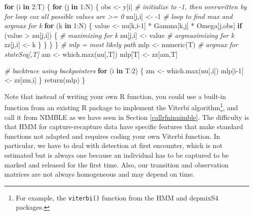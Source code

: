\documentclass[
  12pt,
]{krantz}
\newenvironment{Shaded}{\begin{snugshade}}{\end{snugshade}}
\newcommand{\CommentTok}[1]{\textcolor[rgb]{0.56,0.35,0.01}{\textit{#1}}}
\newcommand{\ControlFlowTok}[1]{\textcolor[rgb]{0.13,0.29,0.53}{\textbf{#1}}}
\newcommand{\DecValTok}[1]{\textcolor[rgb]{0.00,0.00,0.81}{#1}}
\newcommand{\FunctionTok}[1]{\textcolor[rgb]{0.00,0.00,0.00}{#1}}
\newcommand{\NormalTok}[1]{#1}
\newcommand{\OtherTok}[1]{\textcolor[rgb]{0.56,0.35,0.01}{#1}}
\newcommand{\SpecialCharTok}[1]{\textcolor[rgb]{0.00,0.00,0.00}{#1}}
\begin{document}
\begin{Shaded}
\begin{Highlighting}[]
\ControlFlowTok{for}\NormalTok{ (i }\ControlFlowTok{in} \DecValTok{2}\SpecialCharTok{:}\NormalTok{T) \{}
    \ControlFlowTok{for}\NormalTok{ (j }\ControlFlowTok{in} \DecValTok{1}\SpecialCharTok{:}\NormalTok{N) \{}
\NormalTok{      obs }\OtherTok{\textless{}{-}}\NormalTok{ y[i]}
      \CommentTok{\# initialize to {-}1, then overwritten by for loop coz all possible values are \textgreater{}= 0}
\NormalTok{      nu[j,i] }\OtherTok{\textless{}{-}} \SpecialCharTok{{-}}\DecValTok{1}
      \CommentTok{\# loop to find max and argmax for k}
      \ControlFlowTok{for}\NormalTok{ (k }\ControlFlowTok{in} \DecValTok{1}\SpecialCharTok{:}\NormalTok{N) \{}
\NormalTok{        value }\OtherTok{\textless{}{-}}\NormalTok{ nu[k,i}\DecValTok{{-}1}\NormalTok{] }\SpecialCharTok{*}\NormalTok{ Gamma[k,j] }\SpecialCharTok{*}\NormalTok{ Omega[j,obs]}
        \ControlFlowTok{if}\NormalTok{ (value }\SpecialCharTok{\textgreater{}}\NormalTok{ nu[j,i]) \{}
          \CommentTok{\# maximizing for k}
\NormalTok{          nu[j,i] }\OtherTok{\textless{}{-}}\NormalTok{ value}
          \CommentTok{\# argmaximizing for k}
\NormalTok{          zz[j,i] }\OtherTok{\textless{}{-}}\NormalTok{ k}
\NormalTok{        \}}
\NormalTok{      \}}
\NormalTok{    \}}
\NormalTok{  \}}
  \CommentTok{\# mlp = most likely path}
\NormalTok{  mlp }\OtherTok{\textless{}{-}} \FunctionTok{numeric}\NormalTok{(T)}
  \CommentTok{\# argmax for stateSeq[,T]}
\NormalTok{  am }\OtherTok{\textless{}{-}} \FunctionTok{which.max}\NormalTok{(nu[,T])}
\NormalTok{  mlp[T] }\OtherTok{\textless{}{-}}\NormalTok{ zz[am,T]}
  
  \CommentTok{\# backtrace using backpointers}
  \ControlFlowTok{for}\NormalTok{ (i }\ControlFlowTok{in}\NormalTok{ T}\SpecialCharTok{:}\DecValTok{2}\NormalTok{) \{}
\NormalTok{    zm }\OtherTok{\textless{}{-}} \FunctionTok{which.max}\NormalTok{(nu[,i])}
\NormalTok{    mlp[i}\DecValTok{{-}1}\NormalTok{] }\OtherTok{\textless{}{-}}\NormalTok{ zz[zm,i]}
\NormalTok{  \}}
  \FunctionTok{return}\NormalTok{(mlp)}
\NormalTok{\}}
\end{Highlighting}
\end{Shaded}

Note that instead of writing your own R function, you could use a built-in function from an existing R package to implement the Viterbi algorithm\footnote{For example, the \texttt{viterbi()} function from the HMM and depmixS4 packages.}, and call it from NIMBLE as we have seen in Section \ref{callrfninnimble}. The difficulty is that HMM for capture-recapture data have specific features that make standard functions not adapted and requires coding your own Viterbi function. In particular, we have to deal with detection at first encounter, which is not estimated but is always one because an individual has to be captured to be marked and released for the first time. Also, our transition and observation matrices are not always homogeneous and may depend on time.
\end{document}
